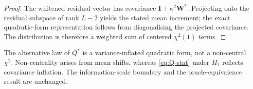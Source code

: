 \begin{proof}
The whitened residual vector has covariance $\mathbf I + \kappa^2 \mathbf W^*$.
Projecting onto the residual subspace of rank $L-2$ yields the stated mean
increment; the exact quadratic-form representation follows from diagonalising the
projected covariance. The distribution is therefore a weighted sum of centered
$\chi^2(1)$ terms.
\end{proof}

    \begin{remark}
    The alternative law of $Q^*$ is a variance-inflated quadratic form, not a
    non-central $\chi^2$.  Non-centrality arises from mean shifts, whereas
    \eqref{eq:Q-stat} under $H_1$ reflects covariance inflation.  The
    information-scale boundary and the oracle-equivalence result are unchanged.
    \end{remark}
